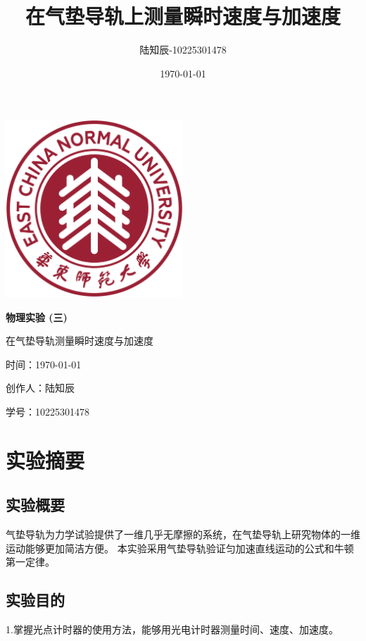 \documentclass{ctexart}
\title{在气垫导轨上测量瞬时速度与加速度}
\author{陆知辰-10225301478}
\date{\today}
\begin{document}
\begin{titlepage}
  \centering
  \includegraphics[width=0.5\textwidth]{ecnu.png}
  
  \vspace*{\baselineskip}
  
  \Huge\textbf{物\quad 理\quad 实\quad 验 \quad (三)}
  \vspace*{0.3\baselineskip}
  
  \huge 在气垫导轨测量瞬时速度与加速度
  
  \vspace*{2\baselineskip}
  
  \large 时间：\today
  
  \vspace*{\baselineskip}
  
  \large 创作人：陆知辰
  
  \vspace*{\baselineskip}
  
  \large 学号：10225301478
  
\end{titlepage}
\newpage
\tableofcontents
\newpage
\section{实验摘要}
  \subsection{实验概要}
  气垫导轨为力学试验提供了一维几乎无摩擦的系统，在气垫导轨上研究物体的一维运动能够更加简洁方便。
  本实验采用气垫导轨验证匀加速直线运动的公式和牛顿第一定律。
  \subsection{实验目的}
  1.\quad 掌握光点计时器的使用方法，能够用光电计时器测量时间、速度、加速度。
\end{document}
